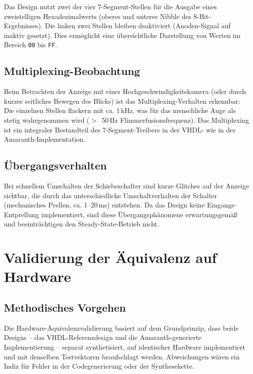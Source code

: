 ﻿\documentclass[12pt,a4paper]{report}
\begin{document}
Das Design nutzt zwei der vier 7-Segment-Stellen für die Ausgabe eines zweistelligen Hexadezimalwerts (oberes und unteres Nibble des 8-Bit-Ergebnisses). Die linken zwei Stellen bleiben deaktiviert (Anoden-Signal auf inaktiv gesetzt). Dies ermöglicht eine übersichtliche Darstellung von Werten im Bereich \texttt{00} bis \texttt{FF}.

\subsection{Multiplexing-Beobachtung}
\label{subsec:multiplexing}

Beim Betrachten der Anzeige mit einer Hochgeschwindigkeitskamera (oder durch kurzes seitliches Bewegen des Blicks) ist das Multiplexing-Verhalten erkennbar: Die einzelnen Stellen flackern mit ca. 1\,kHz, was für das menschliche Auge als stetig wahrgenommen wird ($>$~50\,Hz Flimmerfusionsfrequenz). Das Multiplexing ist ein integraler Bestandteil des 7-Segment-Treibers in der VHDL- wie in der Amaranth-Implementation.

\subsection{Übergangsverhalten}
\label{subsec:uebergangsverhalten}

Bei schnellem Umschalten der Schiebeschalter sind kurze Glitches auf der Anzeige sichtbar, die durch das unterschiedliche Umschaltverhalten der Schalter (mechanisches Prellen, ca. 1--20\,ms) entstehen. Da das Design keine Eingangs-Entprellung implementiert, sind diese Übergangsphänomene erwartungsgemäß und beeinträchtigen den Steady-State-Betrieb nicht.

\section{Validierung der Äquivalenz auf Hardware}
\label{sec:aequivalenz_hardware}

\subsection{Methodisches Vorgehen}
\label{subsec:methodik_aequivalenz}

Die Hardware-Äquivalenzvalidierung basiert auf dem Grundprinzip, dass beide Designs -- das VHDL-Referenzdesign und die Amaranth-generierte Implementierung -- separat synthetisiert, auf identischer Hardware implementiert und mit denselben Testvektoren beaufschlagt werden. Abweichungen wären ein Indiz für Fehler in der Codegenerierung oder der Synthesekette.
\end{document}
